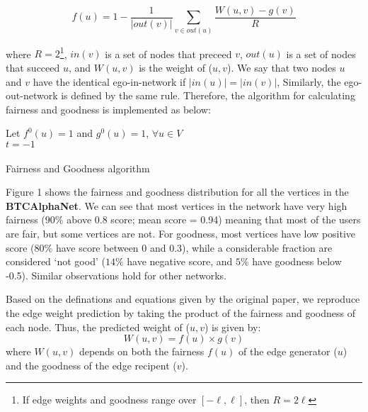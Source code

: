 \begin{equation}
    f(u) = 1 - \frac{1}{|out(v)|}\sum_{v \in out(u)}\frac{W(u,v)-g(v)}{R}
\end{equation}

where $R=2$\footnote{If edge weights and goodness range over $[-\ell, \ell]$, then $R = 2\ell$},
$in(v)$ is a set of nodes that preceed $v$, $out(u)$ is 
a set of nodes that succeed $u$, and $W(u,v)$ is the weight
of ($u,v$). We say that two nodes $u$ and $v$ have the identical
ego-in-network if $|in(u)| = |in(v)|$, Similarly, the ego-out-network
is defined by the same rule. Therefore, the algorithm for calculating
fairness and goodness is implemented as below:

\begin{algorithm}
    Let $f^0(u) = 1$ and $g^0(u) = 1$, $\forall u \in V$ \\
    $t = -1$ \\
    \\
    \caption{Fairness and Goodness algorithm}
\end{algorithm}

Figure 1 shows the fairness and goodness distribution for all 
the vertices in the \textbf{BTCAlphaNet}. We can see that most vertices
in the network have very high fairness ($90\%$ above 0.8 score; mean score = 0.94)
meaning that most of the users are fair, but some vertices are not.
For goodness, most vertices have low positive score ($80\%$ have 
score between 0 and 0.3), while a considerable fraction are 
considered ‘not good’ ($14\%$ have negative score, and $5\%$ have 
goodness below -0.5). Similar observations hold for other 
networks.

Based on the definations and equations given by the original paper, we reproduce
the edge weight prediction by taking the product of the fairness and
goodness of each node. Thus, the predicted weight of ($u,v$) is given by:
\begin{equation}
    W(u,v) = f(u) \times g(v)
\end{equation}
where $W(u,v)$ depends on both the fairness $f(u)$ of the edge 
generator ($u$) and the goodness of the edge recipent ($v$).

